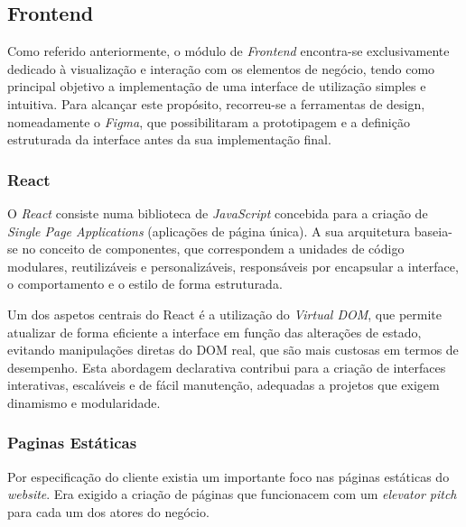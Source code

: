 \subsection{Frontend}

Como referido anteriormente, o módulo de \textit{Frontend} encontra-se exclusivamente dedicado à visualização e interação com os elementos de negócio, tendo como principal objetivo a implementação de uma interface de utilização simples e intuitiva. Para alcançar este propósito, recorreu-se a ferramentas de design, nomeadamente o \textit{Figma}, que possibilitaram a prototipagem e a definição estruturada da interface antes da sua implementação final.

\subsubsection{React}

O \textit{React} consiste numa biblioteca de \textit{JavaScript} concebida para a criação de \textit{Single Page Applications} (aplicações de página única). A sua arquitetura baseia-se no conceito de componentes, que correspondem a unidades de código modulares, reutilizáveis e personalizáveis, responsáveis por encapsular a interface, o comportamento e o estilo de forma estruturada.

Um dos aspetos centrais do React é a utilização do \textit{Virtual DOM}, que permite atualizar de forma eficiente a interface em função das alterações de estado, evitando manipulações diretas do DOM real, que são mais custosas em termos de desempenho. Esta abordagem declarativa contribui para a criação de interfaces interativas, escaláveis e de fácil manutenção, adequadas a projetos que exigem dinamismo e modularidade.


\subsubsection{Paginas Estáticas}

Por especificação do cliente existia um importante foco nas páginas estáticas do \textit{website}. Era exigido a criação de páginas que funcionacem com um \textit{elevator pitch} para cada um dos atores do negócio.

